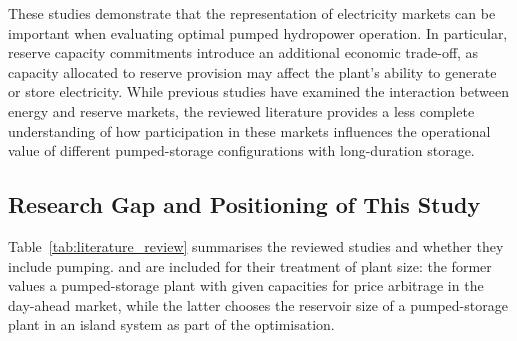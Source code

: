 These studies demonstrate that the representation of electricity markets can be important when evaluating optimal pumped hydropower operation. In particular, reserve capacity commitments introduce an additional economic trade-off, as capacity allocated to reserve provision may affect the plant's ability to generate or store electricity. While previous studies have examined the interaction between energy and reserve markets, the reviewed literature provides a less complete understanding of how participation in these markets influences the operational value of different pumped-storage configurations with long-duration storage.


\subsection{Research Gap and Positioning of This Study}


Table~\ref{tab:literature_review} summarises the reviewed studies and whether they include pumping. \textcite{sauhats2016optimal} and \textcite{zisos2023mixing} are included for their treatment of plant size: the former values a pumped-storage plant with given capacities for price arbitrage in the day-ahead market, while the latter chooses the reservoir size of a pumped-storage plant in an island system as part of the optimisation.

